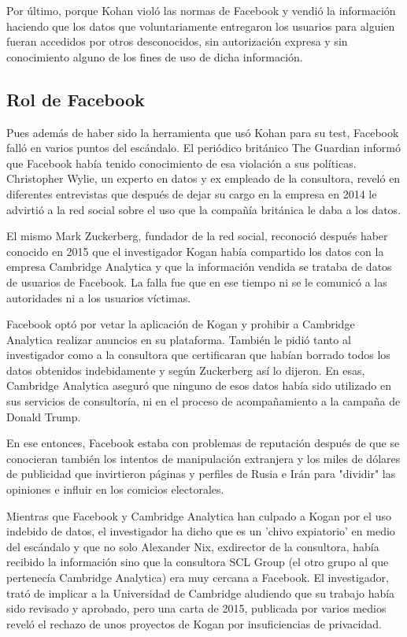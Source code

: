 Por último, porque Kohan violó las normas de Facebook y vendió la información haciendo que los datos que voluntariamente entregaron los usuarios para alguien fueran accedidos por otros desconocidos, sin autorización expresa y sin conocimiento alguno de los fines de uso de dicha información. 

\subsection{Rol de Facebook}

Pues además de haber sido la herramienta que usó Kohan para su test, Facebook falló en varios puntos del escándalo. El periódico británico The Guardian informó que Facebook había tenido conocimiento de esa violación a sus políticas. Christopher Wylie, un experto en datos y ex empleado de la consultora, reveló en diferentes entrevistas que después de dejar su cargo en la empresa en 2014 le advirtió a la red social sobre el uso que la compañía británica le daba a los datos. 

El mismo Mark Zuckerberg, fundador de la red social, reconoció después haber conocido en 2015 que el investigador Kogan había compartido los datos con la empresa Cambridge Analytica y que la información vendida se trataba de datos de usuarios de Facebook. La falla fue que en ese tiempo ni se le comunicó a las autoridades ni a los usuarios víctimas.

Facebook optó por vetar la aplicación de Kogan y prohibir a Cambridge Analytica realizar anuncios en su plataforma. También le pidió tanto al investigador como a la consultora que certificaran que habían borrado todos los datos obtenidos indebidamente y según Zuckerberg así lo dijeron. En esas, Cambridge Analytica aseguró que ninguno de esos datos había sido utilizado en sus servicios de consultoría, ni en el proceso de acompañamiento a la campaña de Donald Trump. 

En ese entonces, Facebook estaba con problemas de reputación después de que se conocieran también los intentos de manipulación extranjera y los miles de dólares de publicidad que invirtieron páginas y perfiles de Rusia e Irán para "dividir" las opiniones e influir en los comicios electorales. 

Mientras que Facebook y Cambridge Analytica han culpado a Kogan por el uso indebido de datos, el investigador ha dicho que es un 'chivo expiatorio' en medio del escándalo y que no solo Alexander Nix, exdirector de la consultora, había recibido la información sino que la consultora SCL Group (el otro grupo al que pertenecía Cambridge Analytica) era muy cercana a Facebook. El investigador, trató de implicar a la Universidad de Cambridge aludiendo que su trabajo había sido revisado y aprobado, pero una carta de 2015, publicada por varios medios reveló el rechazo de unos proyectos de Kogan por insuficiencias de privacidad.
